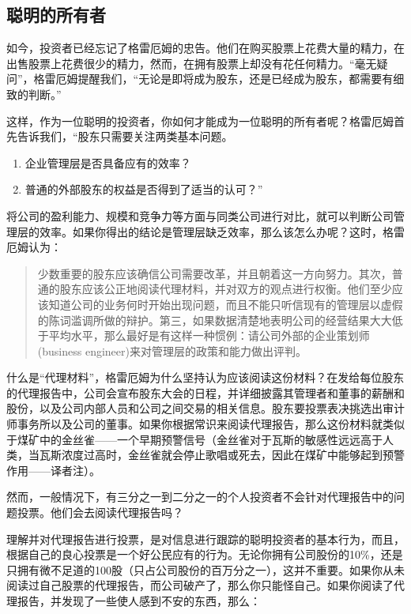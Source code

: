 \documentclass[12pt,oneside]{book}
\begin{document}
\subsection{聪明的所有者}
如今，投资者已经忘记了格雷厄姆的忠告。他们在购买股票上花费大量的精力，在出售股票上花费很少的精力，然而，在拥有股票上却没有花任何精力。“毫无疑问”，格雷厄姆提醒我们，“无论是即将成为股东，还是已经成为股东，都需要有细致的判断。”

这样，作为一位聪明的投资者，你如何才能成为一位聪明的所有者呢？格雷厄姆首先告诉我们，“股东只需要关注两类基本问题。

\begin{enumerate}
\item 企业管理层是否具备应有的效率？
\item 普通的外部股东的权益是否得到了适当的认可？”
\end{enumerate}

将公司的盈利能力、规模和竞争力等方面与同类公司进行对比，就可以判断公司管理层的效率。如果你得出的结论是管理层缺乏效率，那么该怎么办呢？这时，格雷厄姆认为：

\begin{quote}
少数重要的股东应该确信公司需要改革，并且朝着这一方向努力。其次，普通的股东应该公正地阅读代理材料，并对双方的观点进行权衡。他们至少应该知道公司的业务何时开始出现问题，而且不能只听信现有的管理层以虚假的陈词滥调所做的辩护。第三，如果数据清楚地表明公司的经营结果大大低于平均水平，那么最好是有这样一种惯例：请公司外部的企业策划师(business engineer)来对管理层的政策和能力做出评判。
\end{quote}

什么是“代理材料”，格雷厄姆为什么坚持认为应该阅读这份材料？在发给每位股东的代理报告中，公司会宣布股东大会的日程，并详细披露其管理者和董事的薪酬和股份，以及公司内部人员和公司之间交易的相关信息。股东要投票表决挑选出审计师事务所以及公司的董事。如果你根据常识来阅读代理报告，那么这份材料就类似于煤矿中的金丝雀——一个早期预警信号（金丝雀对于瓦斯的敏感性远远高于人类，当瓦斯浓度过高时，金丝雀就会停止歌唱或死去，因此在煤矿中能够起到预警作用——译者注）。

然而，一般情况下，有三分之一到二分之一的个人投资者不会针对代理报告中的问题投票。他们会去阅读代理报告吗？

理解并对代理报告进行投票，是对信息进行跟踪的聪明投资者的基本行为，而且，根据自己的良心投票是一个好公民应有的行为。无论你拥有公司股份的10\%，还是只拥有微不足道的100股（只占公司股份的百万分之一），这并不重要。如果你从未阅读过自己股票的代理报告，而公司破产了，那么你只能怪自己。如果你阅读了代理报告，并发现了一些使人感到不安的东西，那么：
\end{document}
